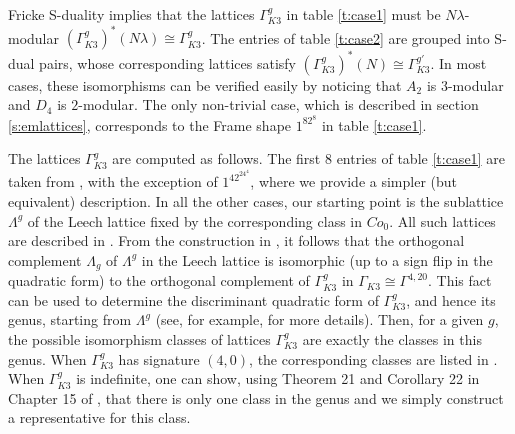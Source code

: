 \documentclass[a4paper,11pt]{article}
\numberwithin{equation}{section}
\begin{document}
Fricke S-duality implies that the lattices $\Gamma_{K3}^g$ in table \ref{t:case1} must be $N\lambda$-modular $(\Gamma_{K3}^g)^*(N\lambda)\cong \Gamma_{K3}^g$. The entries of table \ref{t:case2} are grouped into S-dual pairs, whose corresponding lattices satisfy $(\Gamma_{K3}^g)^*(N)\cong \Gamma_{K3}^{g'}$. In most cases, these isomorphisms can be verified easily by noticing that $A_2$ is $3$-modular and $D_4$ is $2$-modular. The only non-trivial case, which is described in section \ref{s:emlattices}, corresponds to the Frame shape $1^82^8$ in table \ref{t:case1}.

The lattices $\Gamma_{K3}^g$ are computed as follows. The first $8$ entries of table \ref{t:case1} are taken from \cite{GarbagnatiSarti2009}, with the exception of $1^42^24^4$, where we provide a simpler (but equivalent) description. In all the other cases, our starting point is the sublattice $\Lambda^g$ of the Leech lattice fixed by the corresponding class in $Co_0$. All such lattices are described in \cite{HaradaLang1990}. From the construction in \cite{Gaberdiel:2011fg}, it follows that the orthogonal complement $\Lambda_g$ of $\Lambda^g$ in the Leech lattice  is isomorphic (up to a sign flip in the quadratic form) to the orthogonal complement  of $\Gamma_{K3}^g$ in $\Gamma_{K3}\cong \Gamma^{4,20}$. This fact can be used to determine the discriminant quadratic form of $\Gamma_{K3}^g$, and hence its genus, starting from $\Lambda^g$ (see, for example, \cite{Nikulin} for more details). Then, for a given $g$, the possible isomorphism classes of lattices $\Gamma_{K3}^g$ are exactly the classes in this genus. When $\Gamma_{K3}^g$ has signature $(4,0)$, the corresponding classes are listed in \cite{Nipp1991}. When $\Gamma_{K3}^g$ is indefinite, one can show, using Theorem 21 and Corollary 22 in Chapter 15 of \cite{ConwaySloane}, that there is only one class in the genus and we simply construct a representative for this class.


\newpage
\end{document}
